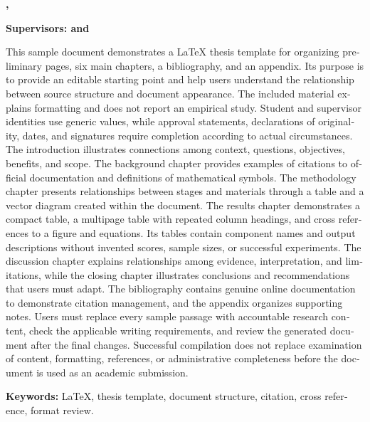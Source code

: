 
\begin{otherlanguage}{english}
\noindent\textbf{\namamahasiswa, \judulskripsiinggris}\par
\noindent\textbf{Supervisors: \pembimbingsatu{} and \pembimbingdua}\par
\vspace{\baselineskip}

This sample document demonstrates a LaTeX thesis template for organizing preliminary pages, six main chapters, a bibliography, and an appendix. Its purpose is to provide an editable starting point and help users understand the relationship between source structure and document appearance. The included material explains formatting and does not report an empirical study. Student and supervisor identities use generic values, while approval statements, declarations of originality, dates, and signatures require completion according to actual circumstances. The introduction illustrates connections among context, questions, objectives, benefits, and scope. The background chapter provides examples of citations to official documentation and definitions of mathematical symbols. The methodology chapter presents relationships between stages and materials through a table and a vector diagram created within the document. The results chapter demonstrates a compact table, a multipage table with repeated column headings, and cross references to a figure and equations. Its tables contain component names and output descriptions without invented scores, sample sizes, or successful experiments. The discussion chapter explains relationships among evidence, interpretation, and limitations, while the closing chapter illustrates conclusions and recommendations that users must adapt. The bibliography contains genuine online documentation to demonstrate citation management, and the appendix organizes supporting notes. Users must replace every sample passage with accountable research content, check the applicable writing requirements, and review the generated document after the final changes. Successful compilation does not replace examination of content, formatting, references, or administrative completeness before the document is used as an academic submission.

\noindent\textbf{Keywords:} LaTeX, thesis template, document structure, citation, cross reference, format review.
\end{otherlanguage}
